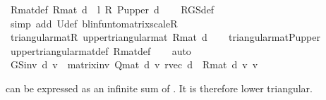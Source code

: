 \begin{isabellebody}
\ R{\isacharunderscore}{\kern0pt}mat{\isacharunderscore}{\kern0pt}def{\isacharcolon}{\kern0pt}\ {\isachardoublequoteopen}R{\isacharunderscore}{\kern0pt}mat\ d\ {\isacharequal}{\kern0pt}\ l\ {\isacharasterisk}{\kern0pt}\isactrlsub R\ P{\isacharunderscore}{\kern0pt}upper\ d{\isachardoublequoteclose}\isanewline
%
\isadelimproof
\ \ %
\endisadelimproof
%
\isatagproof
{}\isamarkupfalse%
\ R{\isacharunderscore}{\kern0pt}GS{\isacharunderscore}{\kern0pt}def\isanewline
\ \ \isamarkupfalse%
\ {\isacharparenleft}{\kern0pt}simp\ add{\isacharcolon}{\kern0pt}\ {\isasymP}\isactrlsub U{\isacharunderscore}{\kern0pt}def\ blinfun{\isacharunderscore}{\kern0pt}to{\isacharunderscore}{\kern0pt}matrix{\isacharunderscore}{\kern0pt}scaleR{\isacharparenright}{\kern0pt}%
\endisatagproof
{\isafoldproof}%
%
\isadelimproof
\isanewline
%
\endisadelimproof
\isanewline
{}\isamarkupfalse%
\ triangular{\isacharunderscore}{\kern0pt}mat{\isacharunderscore}{\kern0pt}R{\isacharcolon}{\kern0pt}\ {\isachardoublequoteopen}upper{\isacharunderscore}{\kern0pt}triangular{\isacharunderscore}{\kern0pt}mat\ {\isacharparenleft}{\kern0pt}R{\isacharunderscore}{\kern0pt}mat\ d{\isacharparenright}{\kern0pt}{\isachardoublequoteclose}\isanewline
%
\isadelimproof
\ \ %
\endisadelimproof
%
\isatagproof
{}\isamarkupfalse%
\ triangular{\isacharunderscore}{\kern0pt}mat{\isacharunderscore}{\kern0pt}P{\isacharunderscore}{\kern0pt}upper\isanewline
\ \ \isamarkupfalse%
\ upper{\isacharunderscore}{\kern0pt}triangular{\isacharunderscore}{\kern0pt}mat{\isacharunderscore}{\kern0pt}def\ R{\isacharunderscore}{\kern0pt}mat{\isacharunderscore}{\kern0pt}def\isanewline
\ \ \isamarkupfalse%
\ auto%
\endisatagproof
{\isafoldproof}%
%
\isadelimproof
\isanewline
%
\endisadelimproof
\isanewline
{}\isamarkupfalse%
\ {\isachardoublequoteopen}GS{\isacharunderscore}{\kern0pt}inv\ d\ v\ {\isasymequiv}\ matrix{\isacharunderscore}{\kern0pt}inv\ {\isacharparenleft}{\kern0pt}Q{\isacharunderscore}{\kern0pt}mat\ d{\isacharparenright}{\kern0pt}\ {\isacharasterisk}{\kern0pt}v\ {\isacharparenleft}{\kern0pt}r{\isacharunderscore}{\kern0pt}vec\ d\ {\isacharplus}{\kern0pt}\ R{\isacharunderscore}{\kern0pt}mat\ d\ {\isacharasterisk}{\kern0pt}v\ v{\isacharparenright}{\kern0pt}{\isachardoublequoteclose}%
\begin{isamarkuptext}%
 can be expressed as an infinite sum of . 
  It is therefore lower triangular.%
\end{isamarkuptext}\isamarkuptrue%

\end{isabellebody}
